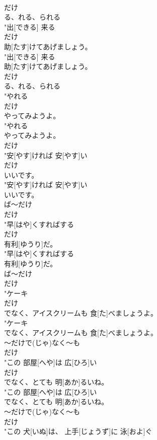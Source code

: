 \documentclass[8pt]{extreport}
\begin{document}
\begin{CJK}{UTF8}{min}
\\	だけ
\\	る、れる、られる 
\\	"出[できる] 来る
\\	だけ
\\	助[たす]けてあげましょう。
\\	"出[できる] 来る
\\	助[たす]けてあげましょう。
\\	だけ
\\	る、れる、られる 
\\	"やれる
\\	だけ
\\	やってみようよ。
\\	"やれる
\\	やってみようよ。
\\	だけ
\\	"安[やす]ければ 安[やす]い
\\	だけ
\\	いいです。
\\	"安[やす]ければ 安[やす]い
\\	いいです。
\\	ば～だけ	
\\	だけ
\\	"早[はや]くすればする
\\	だけ
\\	有利[ゆうり]だ。
\\	"早[はや]くすればする
\\	有利[ゆうり]だ。
\\	ば～だけ	
\\	だけ
\\	"ケーキ
\\	だけ
\\	でなく、アイスクリームも 食[た]べましょうよ。
\\	"ケーキ
\\	でなく、アイスクリームも 食[た]べましょうよ。
\\	～だけで(じゃ)なく～も	
\\	だけ
\\	"この 部屋[へや]は 広[ひろ]い
\\	だけ
\\	でなく、とても 明[あか]るいね。
\\	"この 部屋[へや]は 広[ひろ]い
\\	でなく、とても 明[あか]るいね。
\\	～だけで(じゃ)なく～も	
\\	だけ
\\	"この 犬[いぬ]は、 上手[じょうず]に 泳[およ]ぐ

\end{CJK}
\end{document}
